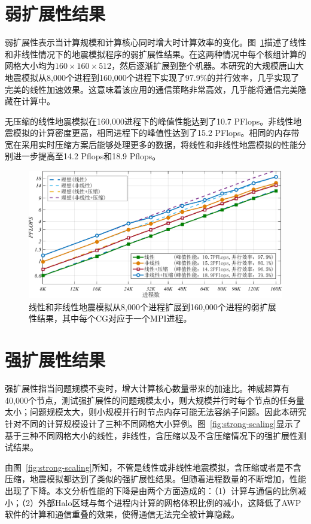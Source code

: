 \documentclass[degree=doctor]{thuthesis}
\begin{document}
\section{弱扩展性结果}

弱扩展性表示当计算规模和计算核心同时增大时计算效率的变化。图~\ref {fig:weak-scaling}描述了线性和非线性情况下的地震模拟程序的弱扩展性结果。在这两种情况中每个核组计算的网格大小均为$160\times 160 \times 512$，然后逐渐扩展到整个机器。本研究的大规模唐山大地震模拟从8,000个进程到160,000个进程下实现了97.9\%的并行效率，几乎实现了完美的线性加速效果。这意味着该应用的通信策略非常高效，几乎能将通信完美隐藏在计算中。

无压缩的线性地震模拟在160,000进程下的峰值性能达到了10.7 PFlops。非线性地震模拟的计算密度更高，相同进程下的峰值性达到了15.2 PFlops。相同的内存带宽在采用实时压缩方案后能够处理更多的数据，将线性和非线性地震模拟的性能分别进一步提高至14.2 Pflops和18.9 Pflops。

\begin{figure}[ht]
\centering
\includegraphics[width=0.9\columnwidth]{weak_scaling.pdf}
\caption{线性和非线性地震模拟从8,000个进程扩展到160,000个进程的弱扩展性结果，其中每个CG对应于一个MPI进程。}
\label{fig:weak-scaling}
\end{figure}

\section{强扩展性结果}

强扩展性指当问题规模不变时，增大计算核心数量带来的加速比。神威超算有40,000个节点，测试强扩展性的问题规模太小，则大规模并行时每个节点的任务量太小；问题规模太大，则小规模并行时节点内存可能无法容纳子问题。因此本研究针对不同的计算规模设计了三种不同网格大小算例。图~\ref {fig:strong-scaling}显示了基于三种不同网格大小的线性，非线性，含压缩以及不含压缩情况下的强扩展性测试结果。 

由图~\ref {fig:strong-scaling}所知，不管是线性或非线性地震模拟，含压缩或者是不含压缩，地震模拟都达到了类似的强扩展性结果。但随着进程数量的不断增加，性能出现了下降。本文分析性能的下降是由两个方面造成的：（1）计算与通信的比例减小；（2）外部Halo区域与每个进程内计算的网格体积比例的减小，这降低了AWP软件的计算和通信重叠的效果，使得通信无法完全被计算隐藏。
\end{document}
